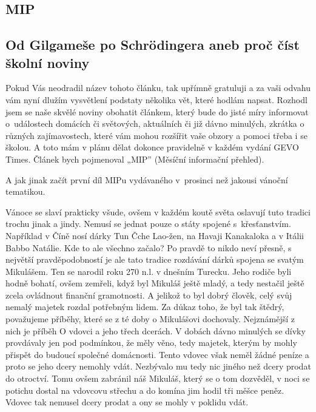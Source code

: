 \documentclass[12pt, a4paper]{article}
\begin{document}
	\begin{multicols*}{2}
		\setlength{\columnseprule}{1pt}

		\begin{center}\section*{MIP}\end{center}
		\subsection*{Od Gilgameše po Schrödingera aneb proč číst školní noviny}

		Pokud Vás neodradil název tohoto článku, tak upřímně
		gratuluji a za vaši odvahu vám nyní dlužím vysvětlení
		podstaty několika vět, které hodlám napsat. Rozhodl
		jsem se naše skvělé noviny obohatit článkem, který
		bude do jisté míry informovat o~událostech domácích či
		světových, aktuálních či již dávno minulých, zkrátka o
		různých zajímavostech, které vám mohou rozšířit vaše
		obzory a pomoci třeba i se školou. A toto mám v plánu
		dělat dokonce pravidelně v každém vydání GEVO
		Times. Článek bych pojmenoval „MIP” (Měsíční informační
		přehled).

		A jak jinak začít první díl MIPu vydávaného v~prosinci 
		než jakousi vánoční tematikou.

		Vánoce se slaví prakticky všude, ovšem v každém koutě
		světa oslavují tuto tradici trochu jinak a jindy. Nemusí
		se jednat pouze o státy spojené s~křesťanstvím.
		Například v Číně nosí dárky Tun Čche Lao-žen, na Havaji
		Kanakaloka a v Itálii Babbo Natálie. Kde to ale všechno
		začalo? Po pravdě to nikdo neví přesně, s největší
		pravděpodobností je ale tato tradice rozdávání dárků
		spojena se svatým Mikulášem. Ten se narodil roku 270
		n.l. v dnešním Turecku. Jeho rodiče byli hodně bohatí,
		ovšem zemřeli, když byl Mikuláš ještě mladý, a tedy
		nestačil ještě zcela ovládnout finanční gramotnosti. A jelikož
		to byl dobrý člověk, celý svůj nemalý majetek rozdal
		potřebným lidem. Za důkaz toho, že byl tak štědrý,
		považujeme příběhy, které se z té doby o Mikulášovi
		dochovaly. Nejznámější z nich je příběh O vdovci a jeho
		třech dcerách. V dobách dávno minulých se dívky
		provdávaly jen pod podmínkou, že měly věno, tedy
		majetek, kterým by mohly přispět do budoucí společné
		domácnosti. Tento vdovec však neměl žádné peníze a
		proto se jeho dcery nemohly vdát. Nezbývalo mu tedy
		nic jiného než dcery prodat do otroctví. Tomu ovšem
		zabránil náš Mikuláš, který se o tom dozvěděl, v noci se
		potichu dostal na vdovcovu střechu a do komína jim
		hodil tři měšce peněz. Vdovec tak nemusel dcery
		prodat a ony se mohly v poklidu vdát.


\end{multicols*}
\end{document}
